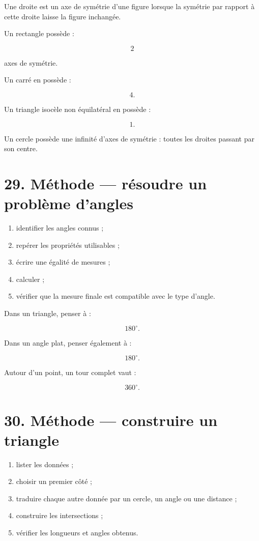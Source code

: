 Une droite est un axe de symétrie d’une figure lorsque la symétrie par rapport à cette droite laisse la figure inchangée.

Un rectangle possède :

\[
2
\]

axes de symétrie.

Un carré en possède :

\[
4.
\]

Un triangle isocèle non équilatéral en possède :

\[
1.
\]

Un cercle possède une infinité d’axes de symétrie : toutes les droites passant par son centre.

\section{29. Méthode — résoudre un problème d’angles}

\begin{enumerate}
\item identifier les angles connus ;
\item repérer les propriétés utilisables ;
\item écrire une égalité de mesures ;
\item calculer ;
\item vérifier que la mesure finale est compatible avec le type d’angle.
\end{enumerate}

Dans un triangle, penser à :

\[
180^\circ.
\]

Dans un angle plat, penser également à :

\[
180^\circ.
\]

Autour d’un point, un tour complet vaut :

\[
360^\circ.
\]

\section{30. Méthode — construire un triangle}

\begin{enumerate}
\item lister les données ;
\item choisir un premier côté ;
\item traduire chaque autre donnée par un cercle, un angle ou une distance ;
\item construire les intersections ;
\item vérifier les longueurs et angles obtenus.
\end{enumerate}

